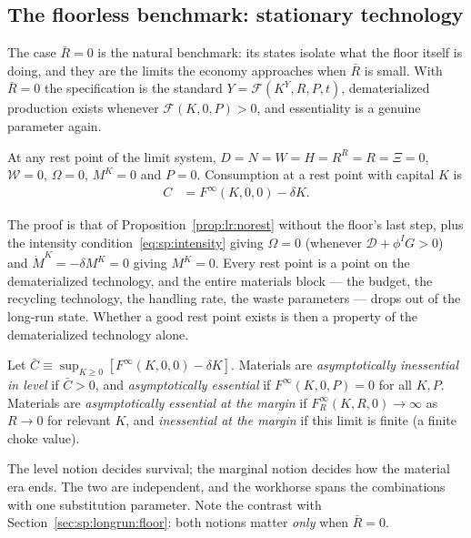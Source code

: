 \subsection{The floorless benchmark: stationary technology}\label{sec:sp:longrun:restpoints}

The case $\bar R=0$ is the natural benchmark: its states isolate what the floor itself is doing, and they are the limits the economy approaches when $\bar R$ is small. With $\bar R=0$ the specification is the standard $Y=\mathcal F\left(K^Y,R,P,t\right)$, dematerialized production exists whenever $\mathcal F\left(K,0,P\right)>0$, and essentiality is a genuine parameter again.

\begin{lemma}\label{lem:lr:autarky}
At any rest point of the limit system, $D=N=W=H=R^R=R=\Xi=0$, $\mathcal W=0$, $\Omega=0$, $M^K=0$ and $P=0$. Consumption at a rest point with capital $K$ is
\begin{align}
C &= F^\infty\left(K,0,0\right)-\delta K .
\label{eq:sp:lr:restC}
\end{align}
\end{lemma}

The proof is that of Proposition~\ref{prop:lr:norest} without the floor's last step, plus the intensity condition~\eqref{eq:sp:intensity} giving $\Omega=0$ (whenever $\mathcal D+\phi^IG>0$) and $\dot M^K=-\delta M^K=0$ giving $M^K=0$. Every rest point is a point on the dematerialized technology, and the entire materials block --- the budget, the recycling technology, the handling rate, the waste parameters --- drops out of the long-run state. Whether a good rest point exists is then a property of the dematerialized technology alone.

\begin{definition}\label{def:lr:essentiality}
Let $\bar C\equiv\sup_{K\ge0}\left[F^\infty\left(K,0,0\right)-\delta K\right]$. Materials are \emph{asymptotically inessential in level} if $\bar C>0$, and \emph{asymptotically essential} if $F^\infty\left(K,0,P\right)=0$ for all $K,P$. Materials are \emph{asymptotically essential at the margin} if $F^\infty_R\left(K,R,0\right)\to\infty$ as $R\to0$ for relevant $K$, and \emph{inessential at the margin} if this limit is finite (a finite choke value).
\end{definition}

The level notion decides survival; the marginal notion decides how the material era ends. The two are independent, and the workhorse spans the combinations with one substitution parameter. Note the contrast with Section~\ref{sec:sp:longrun:floor}: both notions matter \emph{only} when $\bar R=0$.

